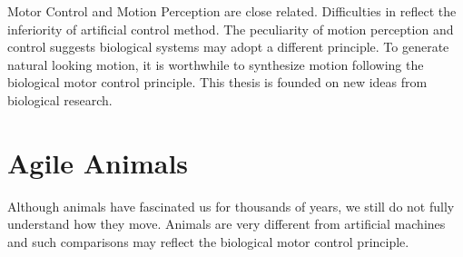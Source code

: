 Motor Control and Motion Perception are close related.
Difficulties in \cms reflect the inferiority of artificial control method.
The peculiarity of motion perception and control suggests  biological systems may adopt a different principle.
To generate natural looking motion, it is worthwhile to synthesize motion following the biological motor control principle. 
This thesis is founded on new ideas from biological research.

 

\section{Agile Animals}
Although animals have fascinated us for thousands of years, we still do not fully understand how they move.
Animals are very different from artificial machines and such comparisons may reflect the  biological motor control principle.

